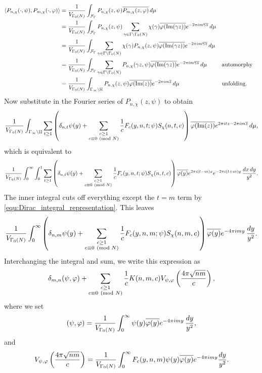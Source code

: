     \begin{align*}
      \langle P_{n,\chi}(\cdot,\psi),P_{m,\chi}(\cdot,\varphi)\rangle &= \frac{1}{V_{\Gamma_{0}(N)}}\int_{\mathcal{F}_{\Gamma}}P_{n,\chi}(z,\psi)\overline{P_{m,\chi}(z,\varphi)}\,d\mu \\
      &= \frac{1}{V_{\Gamma_{0}(N)}}\int_{\mathcal{F}_{\Gamma}}P_{n,\chi}(z,\psi)\sum_{\gamma \in \Gamma\backslash\Gamma_{0}(N)}\chi(\gamma)\overline{\varphi(\mathrm{Im}(\gamma z))}e^{-2\pi im\overline{\gamma z}}\,d\mu \\
      &= \frac{1}{V_{\Gamma_{0}(N)}}\int_{\mathcal{F}_{\Gamma}}\sum_{\gamma \in \Gamma\backslash\Gamma_{0}(N)}\chi(\gamma)P_{n,\chi}(z,\psi)\overline{\varphi(\mathrm{Im}(\gamma z))}e^{-2\pi im\overline{\gamma z}}\,d\mu \\
      &= \frac{1}{V_{\Gamma_{0}(N)}}\int_{\mathcal{F}_{\Gamma}}\sum_{\gamma \in \Gamma\backslash\Gamma_{0}(N)}P_{n,\chi}(\gamma z,\psi)\overline{\varphi(\mathrm{Im}(\gamma z))}e^{-2\pi im\overline{\gamma z}}\,d\mu && \text{automorphy} \\
      &= \frac{1}{V_{\Gamma_{0}(N)}}\int_{\Gamma_{\infty}\backslash\mathbb{H}}P_{n,\chi}(z,\psi)\overline{\varphi(\mathrm{Im}(z))}e^{-2\pi im\overline{z}}\,d\mu && \text{unfolding}.
    \end{align*}
      Now substitute in the Fourier series of $P_{n,\chi}(z,\psi)$ to obtain
      \[
        \frac{1}{V_{\Gamma_{0}(N)}}\int_{\Gamma_{\infty}\backslash\mathbb{H}}\sum_{t \ge 1}\left(\delta_{n,t}\psi(y)+\sum_{\substack{c \ge 1 \\ c \equiv 0 \ \left(\text{mod }N\right)}}\frac{1}{c}F_{c}(y,n,t;\psi)S_{\chi}(n,t,c)\right)\overline{\varphi(\mathrm{Im}(z))}e^{2\pi itz-2\pi im\overline{z}}\,d\mu,
      \]
      which is equivalent to
      \[
        \frac{1}{V_{\Gamma_{0}(N)}}\int_{0}^{\infty}\int_{0}^{1}\sum_{t \ge 1}\left(\delta_{n,t}\psi(y)+\sum_{\substack{c \ge 1 \\ c \equiv 0 \ \left(\text{mod }N\right)}}\frac{1}{c}F_{c}(y,n,t;\psi)S_{\chi}(n,t,c)\right)\overline{\varphi(y)}e^{2\pi i(t-m)x}e^{-2\pi i(t+m)y}\,\frac{dx\,dy}{y^{2}}.
      \]
      The inner integral cuts off everything except the $t = m$ term by \cref{equ:Dirac_integral_representation}. This leaves
      \[
        \frac{1}{V_{\Gamma_{0}(N)}}\int_{0}^{\infty}\left(\delta_{n,m}\psi(y)+\sum_{\substack{c \ge 1 \\ c \equiv 0 \ \left(\text{mod }N\right)}}\frac{1}{c}F_{c}(y,n,m;\psi)S_{\chi}(n,m,c)\right)\overline{\varphi(y)}e^{-4\pi imy}\,\frac{dy}{y^{2}}.
      \]
      Interchanging the integral and sum, we write this expression as
      \[
        \delta_{m,n}(\psi,\varphi)+\sum_{\substack{c \ge 1 \\ c \equiv 0 \ \left(\text{mod }N\right)}}\frac{1}{c}K(n,m,c)V_{\psi,\varphi}\left(\frac{4\pi\sqrt{nm}}{c}\right),
      \]
      where we set
      \[
        (\psi,\varphi) = \frac{1}{V_{\Gamma_{0}(N)}}\int_{0}^{\infty}\psi(y)\overline{\varphi(y)}e^{-4\pi imy}\,\frac{dy}{y^{2}},
      \]
      and
      \[
        V_{\psi,\varphi}\left(\frac{4\pi\sqrt{nm}}{c}\right) = \frac{1}{V_{\Gamma_{0}(N)}}\int_{0}^{\infty}F_{c}(y,n,m)\psi(y)\overline{\varphi(y)}e^{-4\pi imy}\frac{dy}{y^{2}}.
      \]
